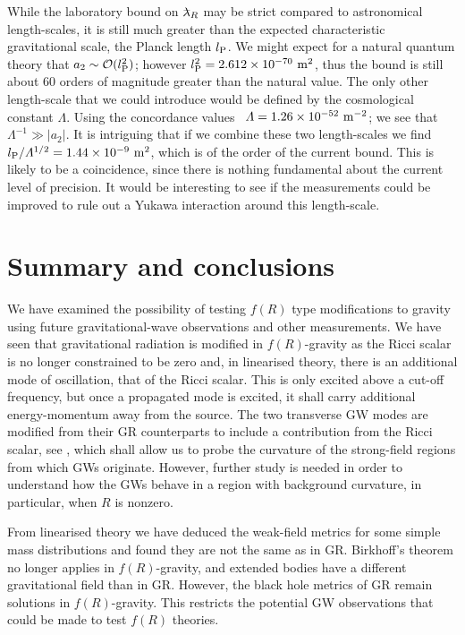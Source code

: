 While the laboratory bound on $\lambdabar_R$ may be strict compared to astronomical length-scales, it is still much greater than the expected characteristic gravitational scale, the Planck length $l_\mathrm{P}$. We might expect for a natural quantum theory that $a_2 \sim \mathcal{O}({l_\mathrm{P}^2})$; however $l_\mathrm{P}^2 = 2.612 \times 10^{-70}~\mathrm{m^2}$, thus the bound is still about $60$ orders of magnitude greater than the natural value. The only other length-scale that we could introduce would be defined by the cosmological constant $\Lambda$. Using the concordance values~\cite{Jarosik2011} $\Lambda = 1.26 \times 10^{-52}~\mathrm{m^{-2}}$; we see that $\Lambda^{-1} \gg |a_2|$. It is intriguing that if we combine these two length-scales we find ${l_\mathrm{P}}/{\Lambda^{1/2}} = 1.44 \times 10^{-9}~\mathrm{m^2}$, which is of the order of the current bound. This is likely to be a coincidence, since there is nothing fundamental about the current level of precision. It would be interesting to see if the measurements could be improved to rule out a Yukawa interaction around this length-scale.

\section{Summary and conclusions\label{sec:f_Discuss}}

We have examined the possibility of testing $f(R)$ type modifications to gravity using future gravitational-wave observations and other measurements. We have seen that gravitational radiation is modified in $f(R)$-gravity as the Ricci scalar is no longer constrained to be zero and, in linearised theory, there is an additional mode of oscillation, that of the Ricci scalar. This is only excited above a cut-off frequency, but once a propagated mode is excited, it shall carry additional energy-momentum away from the source. The two transverse GW modes are modified from their GR counterparts to include a contribution from the Ricci scalar, see , which shall allow us to probe the curvature of the strong-field regions from which GWs originate. However, further study is needed in order to understand how the GWs behave in a region with background curvature, in particular, when $R$ is nonzero.

From linearised theory we have deduced the weak-field metrics for some simple mass distributions and found they are not the same as in GR. Birkhoff's theorem no longer applies in $f(R)$-gravity, and extended bodies have a different gravitational field than in GR. However, the black hole metrics of GR remain solutions in $f(R)$-gravity. This restricts the potential GW observations that could be made to test $f(R)$ theories.

